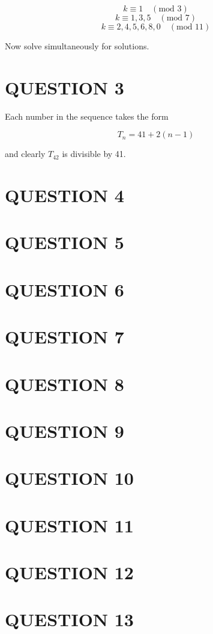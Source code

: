 \documentclass[a4paper]{article}
\begin{document}
\[ k \equiv 1 \quad  (\text{mod } 3) \]
\[ k \equiv 1, 3, 5 \quad  (\text{mod } 7) \]
\[ k \equiv 2, 4,5,6,8,0 \quad  (\text{mod } 11) \]

Now solve simultaneously for solutions.

\section{QUESTION 3}

Each number in the sequence takes the form

\[ T_{n} = 41 + 2(n-1)  \]

and clearly $ T_{42} $ is divisible by 41.

\section{QUESTION 4}




\section{QUESTION 5}
\section{QUESTION 6}
\section{QUESTION 7}
\section{QUESTION 8}
\section{QUESTION 9}
\section{QUESTION 10}
\section{QUESTION 11}
\section{QUESTION 12}
\section{QUESTION 13}
\end{document}
